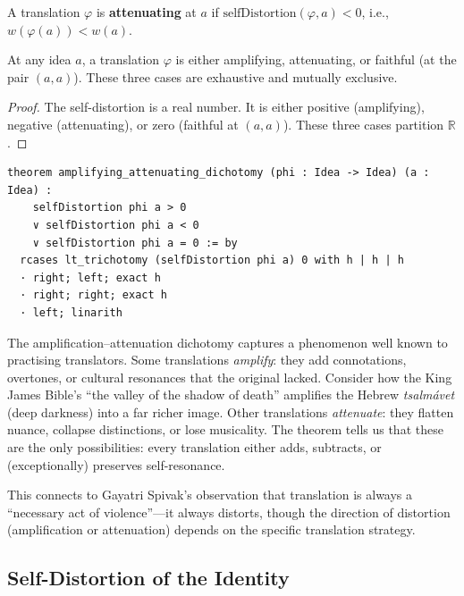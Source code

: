 \begin{definition}
\label{def:attenuating}
A translation $\varphi$ is \textbf{attenuating} at $a$ if
$\mathrm{selfDistortion}(\varphi, a) < 0$, i.e., $w(\varphi(a)) < w(a)$.
\end{definition}

\begin{theorem}
\label{thm:amp-atten-dicho}
At any idea $a$, a translation $\varphi$ is either amplifying, attenuating,
or faithful (at the pair $(a, a)$).  These three cases are exhaustive and
mutually exclusive.
\end{theorem}

\begin{proof}
The self-distortion is a real number.  It is either positive (amplifying),
negative (attenuating), or zero (faithful at $(a, a)$).  These three cases
partition $\mathbb{R}$.
\end{proof}

\begin{lstlisting}
theorem amplifying_attenuating_dichotomy (phi : Idea -> Idea) (a : Idea) :
    selfDistortion phi a > 0
    ∨ selfDistortion phi a < 0
    ∨ selfDistortion phi a = 0 := by
  rcases lt_trichotomy (selfDistortion phi a) 0 with h | h | h
  · right; left; exact h
  · right; right; exact h
  · left; linarith
\end{lstlisting}

\begin{interpretation}
\label{int:amp-atten-loss}
The amplification--attenuation dichotomy captures a phenomenon well known to
practising translators.  Some translations \emph{amplify}: they add
connotations, overtones, or cultural resonances that the original lacked.
Consider how the King James Bible's ``the valley of the shadow of death''
amplifies the Hebrew \emph{tsalmávet} (deep darkness) into a far richer
image.  Other translations \emph{attenuate}: they flatten nuance, collapse
distinctions, or lose musicality.  The theorem tells us that these are the
only possibilities: every translation either adds, subtracts, or
(exceptionally) preserves self-resonance.

This connects to Gayatri Spivak's observation that translation is always
a ``necessary act of violence''---it always distorts, though the direction
of distortion (amplification or attenuation) depends on the specific
translation strategy.
\end{interpretation}

\subsection{Self-Distortion of the Identity}

